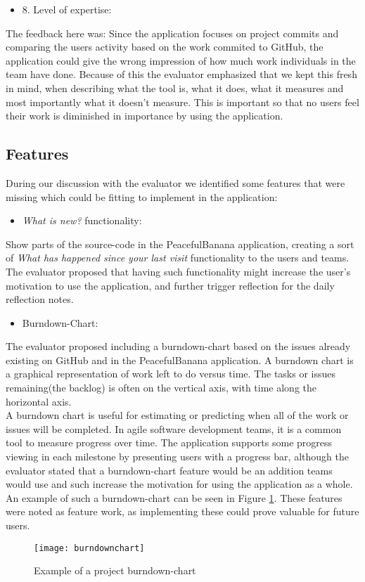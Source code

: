 \begin{itemize}
    \item 8. Level of expertise:   
\end{itemize}
The feedback here was: Since the application focuses on project commits and comparing the users activity based on the work commited to GitHub, the application could give the wrong impression of how much work individuals in the team have done. Because of this the evaluator emphasized that we kept this fresh in mind, when describing what the tool is, what it does, what it measures and most importantly what it doesn't measure. This is important so that no users feel their work is diminished in importance by using the application.

\subsection{Features}
During our discussion with the evaluator we identified some features that were missing which could be fitting to implement in the application:
\begin{itemize}
	\item \emph{What is new?} functionality:
\end{itemize}
Show parts of the source-code in the PeacefulBanana application, creating a sort of \emph{What has happened since your last visit} functionality to the users and teams. The evaluator proposed that having such functionality might increase the user's motivation to use the application, and further trigger reflection for the daily reflection notes. 
\begin{itemize}
	\item Burndown-Chart:
\end{itemize}
The evaluator proposed including a burndown-chart based on the issues already existing on GitHub and in the PeacefulBanana application. A burndown chart is a graphical representation of work left to do versus time. The tasks or issues remaining(the backlog) is often on the vertical axis, with time along the horizontal axis.\\
A burndown chart is useful for estimating or predicting when all of the work or issues will be completed. In agile software development teams, it is a common tool to measure progress over time. The application supports some progress viewing in each milestone by presenting users with a progress bar, although the evaluator stated that a burndown-chart feature would be an addition teams would use and such increase the motivation for using the application as a whole. An example of such a burndown-chart can be seen in Figure \ref{burndownchart}. 
These features were noted as feature work, as implementing these could prove valuable for future users. 

\begin{figure}[H]
    \centering
        \texttt{[image: burndownchart]}
    \caption{Example of a project burndown-chart}
    \label{burndownchart}
\end{figure}
\clearpage